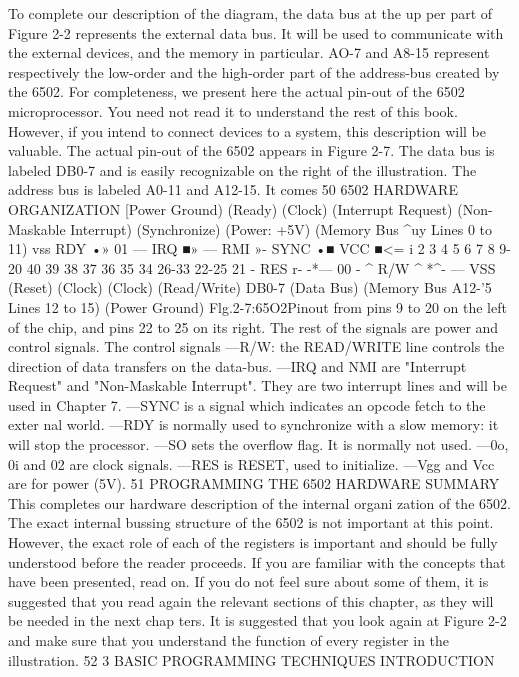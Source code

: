 To complete our description of the diagram, the data bus at the up
per part of Figure 2-2 represents the external data bus. It will be used to
communicate with the external devices, and the memory in particular.
AO-7 and A8-15 represent respectively the low-order and the high-order
part of the address-bus created by the 6502.
For completeness, we present here the actual pin-out of the
6502 microprocessor. You need not read it to understand the rest
of this book. However, if you intend to connect devices to a system,
this description will be valuable.
The actual pin-out of the 6502 appears in Figure 2-7. The data
bus is labeled DB0-7 and is easily recognizable on the right of the
illustration. The address bus is labeled A0-11 and A12-15. It comes
50
6502 HARDWARE ORGANIZATION
[Power Ground)
(Ready)
(Clock)
(Interrupt Request)
(Non-Maskable
Interrupt)
(Synchronize)
(Power: +5V)
(Memory Bus ^uy
Lines 0 to 11)
vss
RDY •»
01 —
IRQ ■»
—
RMI »-
SYNC •■
VCC
■<=
i
2
3
4
5
6
7
8
9-20
40
39
38
37
36
35
34
26-33
22-25
21
- RES
r-
-*— 00
-
^ R/W
^ *^-
— VSS
(Reset)
(Clock)
(Clock)
(Read/Write)
DB0-7 (Data Bus)
(Memory Bus
A12-'5 Lines 12 to 15)
(Power Ground)
Flg.2-7:65O2Pinout
from pins 9 to 20 on the left of the chip, and pins 22 to 25 on its
right.
The rest of the signals are power and control signals.
The control signals
—R/W: the READ/WRITE line controls the direction of data
transfers on the data-bus.
—IRQ and NMI are "Interrupt Request" and "Non-Maskable
Interrupt". They are two interrupt lines and will be used in
Chapter 7.
—SYNC is a signal which indicates an opcode fetch to the exter
nal world.
—RDY is normally used to synchronize with a slow memory: it
will stop the processor.
—SO sets the overflow flag. It is normally not used.
—0o, 0i and 02 are clock signals.
—RES is RESET, used to initialize.
—Vgg and Vcc are for power (5V).
51
PROGRAMMING THE 6502
HARDWARE SUMMARY
This completes our hardware description of the internal organi
zation of the 6502. The exact internal bussing structure of the
6502 is not important at this point. However, the exact role of
each of the registers is important and should be fully understood
before the reader proceeds. If you are familiar with the concepts
that have been presented, read on. If you do not feel sure about
some of them, it is suggested that you read again the relevant
sections of this chapter, as they will be needed in the next chap
ters. It is suggested that you look again at Figure 2-2 and make
sure that you understand the function of every register in the
illustration.
52
3
BASIC PROGRAMMING
TECHNIQUES
INTRODUCTION

